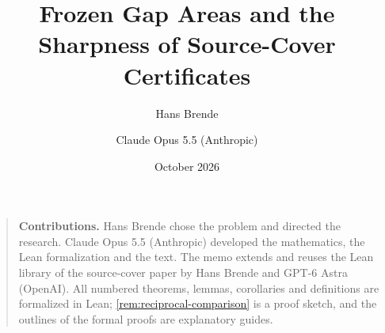 \documentclass[11pt]{article}
\title{Frozen Gap Areas and the Sharpness of Source-Cover Certificates}
\author{Hans Brende \and Claude Opus 5.5 (Anthropic)}
\date{October 2026}
\numberwithin{equation}{section}
\begin{document}
\maketitle
\begin{abstract}

\end{abstract}
\begin{quote}\small
\textbf{Contributions.} Hans Brende chose the problem and directed the research.
Claude Opus 5.5 (Anthropic) developed the mathematics, the Lean formalization and the
text. The memo extends and reuses the Lean library of the source-cover paper by Hans
Brende and GPT-6 Astra (OpenAI). All numbered theorems, lemmas, corollaries and
definitions are formalized in Lean; \cref{rem:reciprocal-comparison} is a proof sketch, and the outlines of
the formal proofs are explanatory guides.
\end{quote}
\begingroup\small\tableofcontents\endgroup







\appendix


\begingroup\small\raggedright


\endgroup
\end{document}
